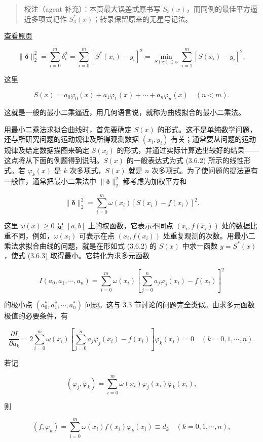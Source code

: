\documentclass[
  10pt,
  fontset=fandol]{ctexart}
\begin{document}
\begin{quote}
校注（agent 补充）：本页最大误差式原书写 \(S_3(x)\)，而同例的最佳平方逼近多项式记作 \(S_3^*(x)\)；转录保留原来的无星号记法。
\end{quote}

\href{../../source-images/pdf-079.jpeg}{查看原页}

\[
\|\boldsymbol\delta\|_2^2=\sum_{i=0}^m\delta_i^2=\sum_{i=0}^m[S^*(x_i)-y_i]^2=\min_{S(x)\in\varphi}\sum_{i=1}^m[S(x_i)-y_i]^2,\tag{3.6.1}
\]

这里

\[
S(x)=a_0\varphi_0(x)+a_1\varphi_1(x)+\cdots+a_n\varphi_n(x)\quad(n<m).\tag{3.6.2}
\]

这就是一般的最小二乘逼近，用几何语言说，就称为曲线拟合的最小二乘法。

用最小二乘法求拟合曲线时，首先要确定 \(S(x)\) 的形式。这不是单纯数学问题，还与所研究问题的运动规律及所得观测数据 \((x_i,y_i)\) 有关；通常要从问题的运动规律及给定数据描图来确定 \(S(x_i)\) 的形式，并通过实际计算选出较好的结果------这点将从下面的例题得到说明。\(S(x)\) 的一般表达式为式 (3.6.2) 所示的线性形式。若 \(\varphi_k(x)\) 是 \(k\) 次多项式，\(S(x)\) 就是 \(n\) 次多项式。为了使问题的提法更有一般性，通常把最小二乘法中 \(\|\boldsymbol\delta\|_2^2\) 都考虑为加权平方和

\[
\|\boldsymbol\delta\|_2^2=\sum_{i=0}^m\omega(x_i)[S(x_i)-f(x_i)]^2.\tag{3.6.3}
\]

这里 \(\omega(x)\geqslant0\) 是 \([a,b]\) 上的权函数，它表示不同点 \((x_i,f(x_i))\) 处的数据比重不同，例如，\(\omega(x_i)\) 可表示在点 \((x_i,f(x_i))\) 处重复观测的次数。用最小二乘法求拟合曲线的问题，就是在形如式 (3.6.2) 的 \(S(x)\) 中求一函数 \(y=S^*(x)\)，使式 (3.6.3) 取得最小。它转化为求多元函数

\[
I(a_0,a_1,\cdots,a_n)=\sum_{i=0}^m\omega(x_i)\left[\sum_{j=0}^na_j\varphi_j(x_i)-f(x_i)\right]^2\tag{3.6.4}
\]

的极小点 \((a_0^*,a_1^*,\cdots,a_n^*)\) 问题。这与 3.3 节讨论的问题完全类似。由求多元函数极值的必要条件，有

\[
\frac{\partial I}{\partial a_k}=2\sum_{i=0}^m\omega(x_i)\left[\sum_{j=0}^na_j\varphi_j(x_i)-f(x_i)\right]\varphi_k(x_i)=0\quad(k=0,1,\cdots,n).
\]

若记

\[
(\varphi_j,\varphi_k)=\sum_{i=0}^m\omega(x_i)\varphi_j(x_i)\varphi_k(x_i),\tag{3.6.5}
\]

则

\[
(f,\varphi_k)=\sum_{i=0}^m\omega(x_i)f(x_i)\varphi_k(x_i)\equiv d_k\quad(k=0,1,\cdots,n),
\]
\end{document}
